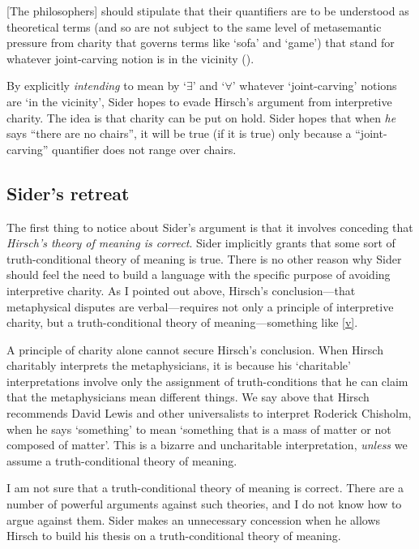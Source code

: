 \documentclass[11pt]{article}
\newenvironment{squote}{%
\begin{spacing}{1}
       	\begin{list}{}{%
\setlength{\labelwidth}{0pt}%
\rightmargin\leftmargin%
}
\item\relax
}{%
\end{list}%
\end{spacing}
}
\begin{document}
\begin{spacing}{1.25}
\begin{squote}
{[}The philosophers{]} should stipulate that their quantifiers are to be
understood as theoretical terms (and so are not subject to the same
level of metasemantic pressure from charity that governs terms like
`sofa' and `game') that stand for whatever joint-carving notion is in
the vicinity (\citeyear[9]{sider2011b}).
\end{squote}

By explicitly \emph{intending} to mean by `$\exists$' and `$\forall$'
whatever `joint-carving' notions are `in the vicinity', Sider hopes to
evade Hirsch's argument from interpretive charity.  The idea is that
charity can be put on hold.  Sider hopes that when {\em he} says
``there are no chairs'', it will be true (if it is true) only because
a ``joint-carving'' quantifier does not range over chairs.

\subsection{Sider's retreat}
The first thing to notice about Sider's argument is that it involves
conceding that {\em Hirsch's theory of meaning is correct}.  Sider
implicitly grants that some sort of truth-conditional theory of
meaning is true.  There is no other reason why Sider should feel the
need to build a language with the specific purpose of avoiding
interpretive charity.  As I pointed out above, Hirsch's
conclusion---that metaphysical disputes are verbal---requires not only
a principle of interpretive charity, but a truth-conditional theory of
meaning---something like \ref{v}.

A principle of charity alone cannot secure Hirsch's conclusion.  When
Hirsch charitably interprets the metaphysicians, it is because his
`charitable' interpretations involve only the assignment of
truth-conditions that he can claim that the metaphysicians mean
different things.  We say above that Hirsch recommends David Lewis and
other universalists to interpret Roderick Chisholm, when he says
`something' to mean `something that is a mass of matter or not
composed of matter'.  This is a bizarre and uncharitable
interpretation, {\em unless} we assume a truth-conditional theory of
meaning.

I am not sure that a truth-conditional theory of meaning is correct.
There are a number of powerful arguments against such theories, and I
do not know how to argue against them.  Sider makes an unnecessary
concession when he allows Hirsch to build his thesis on a
truth-conditional theory of meaning.


\end{spacing}
\end{document}
